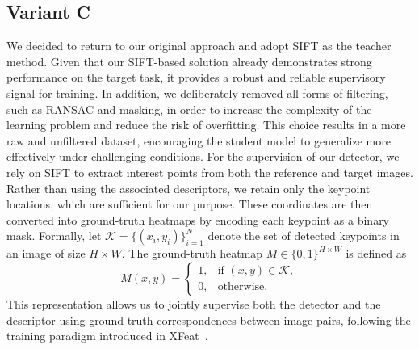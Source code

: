 \subsection{Variant C}
We decided to return to our original approach and adopt SIFT as the teacher
method. Given that our SIFT-based solution already demonstrates strong
performance on the target task, it provides a robust and reliable supervisory
signal for training. In addition, we deliberately removed all forms of
filtering, such as RANSAC and masking, in order to increase the complexity of
the learning problem and reduce the risk of overfitting. This choice results in
a more raw and unfiltered dataset, encouraging the student model to generalize
more effectively under challenging conditions. For the supervision of our
detector, we rely on SIFT to extract interest points from both the reference
and target images. Rather than using the associated descriptors, we retain only
the keypoint locations, which are sufficient for our purpose. These coordinates
are then converted into ground-truth heatmaps by encoding each keypoint as a
binary mask. Formally, let $\mathcal{K} = \{(x_i, y_i)\}_{i=1}^{N}$ denote the
set of detected keypoints in an image of size $H \times W$. The ground-truth
heatmap $M \in \{0,1\}^{H \times W}$ is defined as
\begin{equation}
    M(x,y) =
    \begin{cases}
        1, & \text{if } (x,y) \in \mathcal{K}, \\
        0, & \text{otherwise}.
    \end{cases}
\end{equation}
This representation allows us to jointly supervise both the detector and the descriptor using ground-truth correspondences between image pairs, following the training paradigm introduced in XFeat~\cite{xfeat2023}.


